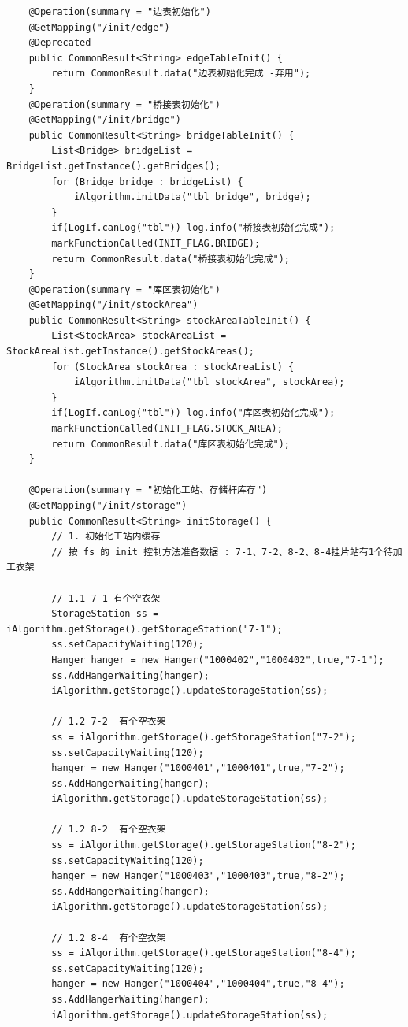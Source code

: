 \begin{lstlisting}
    @Operation(summary = "边表初始化")
    @GetMapping("/init/edge")
    @Deprecated
    public CommonResult<String> edgeTableInit() {
        return CommonResult.data("边表初始化完成 -弃用");
    }
    @Operation(summary = "桥接表初始化")
    @GetMapping("/init/bridge")
    public CommonResult<String> bridgeTableInit() {
        List<Bridge> bridgeList = BridgeList.getInstance().getBridges();
        for (Bridge bridge : bridgeList) {
            iAlgorithm.initData("tbl_bridge", bridge);
        }
        if(LogIf.canLog("tbl")) log.info("桥接表初始化完成");
        markFunctionCalled(INIT_FLAG.BRIDGE);
        return CommonResult.data("桥接表初始化完成");
    }
    @Operation(summary = "库区表初始化")
    @GetMapping("/init/stockArea")
    public CommonResult<String> stockAreaTableInit() {
        List<StockArea> stockAreaList = StockAreaList.getInstance().getStockAreas();
        for (StockArea stockArea : stockAreaList) {
            iAlgorithm.initData("tbl_stockArea", stockArea);
        }
        if(LogIf.canLog("tbl")) log.info("库区表初始化完成");
        markFunctionCalled(INIT_FLAG.STOCK_AREA);
        return CommonResult.data("库区表初始化完成");
    }

    @Operation(summary = "初始化工站、存储杆库存")
    @GetMapping("/init/storage")
    public CommonResult<String> initStorage() {
        // 1. 初始化工站内缓存
        // 按 fs 的 init 控制方法准备数据 : 7-1、7-2、8-2、8-4挂片站有1个待加工衣架

        // 1.1 7-1 有个空衣架
        StorageStation ss = iAlgorithm.getStorage().getStorageStation("7-1");
        ss.setCapacityWaiting(120);
        Hanger hanger = new Hanger("1000402","1000402",true,"7-1");
        ss.AddHangerWaiting(hanger);
        iAlgorithm.getStorage().updateStorageStation(ss);

        // 1.2 7-2  有个空衣架
        ss = iAlgorithm.getStorage().getStorageStation("7-2");
        ss.setCapacityWaiting(120);
        hanger = new Hanger("1000401","1000401",true,"7-2");
        ss.AddHangerWaiting(hanger);
        iAlgorithm.getStorage().updateStorageStation(ss);

        // 1.2 8-2  有个空衣架
        ss = iAlgorithm.getStorage().getStorageStation("8-2");
        ss.setCapacityWaiting(120);
        hanger = new Hanger("1000403","1000403",true,"8-2");
        ss.AddHangerWaiting(hanger);
        iAlgorithm.getStorage().updateStorageStation(ss);

        // 1.2 8-4  有个空衣架
        ss = iAlgorithm.getStorage().getStorageStation("8-4");
        ss.setCapacityWaiting(120);
        hanger = new Hanger("1000404","1000404",true,"8-4");
        ss.AddHangerWaiting(hanger);
        iAlgorithm.getStorage().updateStorageStation(ss);


\end{lstlisting}
